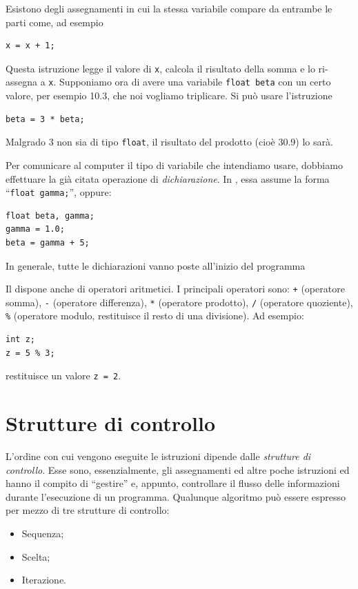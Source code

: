 Esistono degli assegnamenti in cui la stessa variabile compare da entrambe le parti come, ad esempio
\begin{lstlisting}
x = x + 1;
\end{lstlisting}
Questa istruzione legge il valore di \lstinline!x!, calcola il risultato della somma e lo ri-assegna a \lstinline!x!.
Supponiamo ora di avere una variabile \lstinline!float beta! con un certo valore, per esempio \num{10.3}, che noi vogliamo triplicare.
Si può usare l'istruzione
\begin{lstlisting}
beta = 3 * beta;
\end{lstlisting}
Malgrado \num{3} non sia di tipo \lstinline!float!, il risultato del prodotto (cioè \num{30.9}) lo sarà.


Per  comunicare al computer il tipo di variabile che intendiamo usare, dobbiamo effettuare la già citata operazione di \emph{dichiarazione}.
In , essa assume la forma ``\lstinline!float gamma;!'', oppure:
\begin{lstlisting}
float beta, gamma;
gamma = 1.0;
beta = gamma + 5;
\end{lstlisting}
In generale, tutte le dichiarazioni vanno poste all'inizio del programma

Il  dispone anche di operatori aritmetici. I  principali operatori sono: \lstinline!+! (operatore somma), \lstinline!-! (operatore differenza), \lstinline!*! (operatore prodotto), \lstinline!/! (operatore quoziente), \lstinline!%! (operatore modulo, restituisce il resto di una divisione). Ad esempio:
\begin{lstlisting}
int z;
z = 5 % 3;
\end{lstlisting}
restituisce un valore \lstinline!z = 2!.

	\section{Strutture di controllo}
	\label{sec:ContStruc}
L'ordine con cui vengono eseguite le istruzioni dipende dalle \emph{strutture di controllo}.
Esse sono, essenzialmente, gli assegnamenti ed altre poche istruzioni ed hanno il compito di ``gestire'' e, appunto, controllare il flusso delle informazioni durante l'esecuzione di un programma.
Qualunque algoritmo può essere espresso per mezzo di tre strutture di controllo:
\begin{itemize}
	\item
Sequenza;
	\item
Scelta;
	\item
Iterazione.
\end{itemize}

